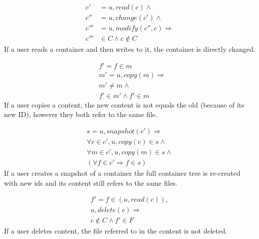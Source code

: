 \documentclass[a4paper,12pt]{article}
\newcommand{\Implies}{\Rightarrow}
\begin{document}
\begin{equation} \label{eq:containerupdate}
    \begin{split}
        c' & = u, read(c) \land \\
        c'' & = u, change(c') \land \\
        c''' & = u, modify(c'', c) \Implies \\
        c''' & \in C \land c \not \in C
    \end{split}
\end{equation}
If a user reads a container and then writes to it, the container is directly changed.

\begin{equation} \label{eq:copy}
    \begin{split}
        & f' = f \in m \\
        & m' = u, copy(m) \Implies \\
        & m' \neq m \land \\
        & f' \in m' \land f' \in m
    \end{split}
\end{equation}
If a user copies a content, the new content is not equals the old (because of its new ID), however
they both refer to the same file.

\begin{equation} \label{eq:snapshot}
    \begin{split}
        s = u, snapshot(c') \Implies \\
        \forall c \in c', u, copy(c) \in s \land \\
        \forall m \in c', u, copy(m) \in s \land \\
        (\forall f \in c' \Implies f \in s)
    \end{split}
\end{equation}
If a user creates a snapshot of a container the full container tree is re-created with new ids and
its content still refers to the same files.

\begin{equation} \label{eq:delete}
    \begin{split}
        f' = f \in (u, read(c)),  \\
        u, delete(c) \Implies \\
        c \not \in C \land f' \in F
    \end{split}
\end{equation}
If a user deletes content, the file referred to in the content is not deleted.
\end{document}
